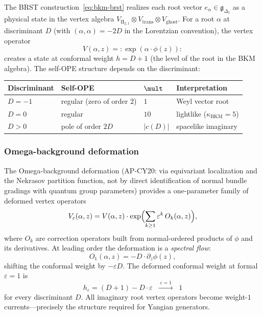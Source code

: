 The BRST construction~\eqref{eq:bkm-brst} realizes each root vector $e_\alpha \in \mathfrak{g}_{\Delta_5}$ as a physical state in the vertex algebra $V_{\mathrm{II}_{2,1}} \otimes V_{\mathrm{trans}} \otimes V_{\mathrm{ghost}}$. For a root $\alpha$ at discriminant $D$ (with $(\alpha, \alpha) = -2D$ in the Lorentzian convention), the vertex operator
\begin{equation}
\label{eq:bkm-vertex-op}
V(\alpha, z) = {:}\exp(\alpha \cdot \phi(z)){:}
\end{equation}
creates a state at conformal weight $h = D + 1$ (the level of the root in the BKM algebra). The self-OPE structure depends on the discriminant:
\begin{center}
\renewcommand{\arraystretch}{1.3}
\begin{tabular}{@{}llll@{}}
\textbf{Discriminant} & \textbf{Self-OPE} & $\mult$ & \textbf{Interpretation} \\ \hline
$D = -1$ & regular (zero of order $2$) & $1$ & Weyl vector root \\
$D = 0$ & regular & $10$ & lightlike ($\kappa_{\mathrm{BKM}} = 5$) \\
$D > 0$ & pole of order $2D$ & $|c(D)|$ & spacelike imaginary
\end{tabular}
\end{center}

\subsubsection{Omega-background deformation}
\label{subsubsec:k3e-omega-deformation}

\begin{conjecture}
\label{conj:vertex-op-yangian}
\ClaimStatusConjectured
The Omega-background deformation (AP-CY20: via equivariant localization and the Nekrasov partition function, not by direct identification of normal bundle gradings with quantum group parameters) provides a one-parameter family of deformed vertex operators
\begin{equation}
\label{eq:deformed-vertex-op}
V_\varepsilon(\alpha, z) = V(\alpha, z) \cdot \exp\Bigl(\sum_{k \geq 1} \varepsilon^k\, O_k(\alpha, z)\Bigr),
\end{equation}
where $O_k$ are correction operators built from normal-ordered products of $\phi$ and its derivatives. At leading order the deformation is a \emph{spectral flow}:
\[
O_1(\alpha, z) = -D \cdot \partial_z \phi(z),
\]
shifting the conformal weight by $-\varepsilon D$. The deformed conformal weight at formal $\varepsilon = 1$ is
\[
h_\varepsilon = (D + 1) - D \cdot \varepsilon \;\;\xrightarrow{\;\varepsilon = 1\;}\;\; 1
\]
for every discriminant $D$. All imaginary root vertex operators become weight-$1$ currents---precisely the structure required for Yangian generators.
\end{conjecture}

